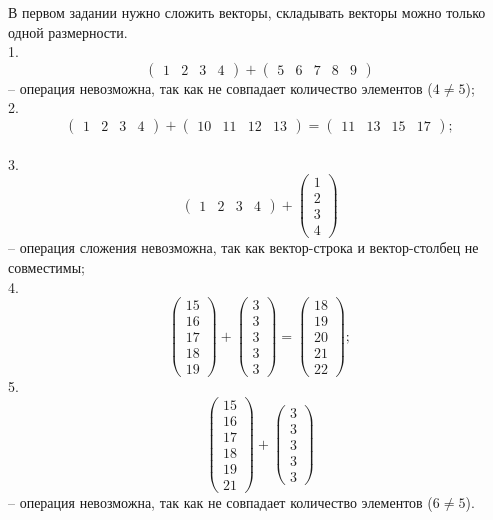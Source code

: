 \documentclass[14pt,a4paper]{extarticle}
\begin{document}
В первом задании нужно сложить векторы, складывать векторы можно только одной размерности.\\
1. \[\begin{pmatrix} 1 & 2 & 3 & 4 \end{pmatrix} + \begin{pmatrix} 5 & 6 & 7 & 8 & 9 \end{pmatrix}\]
-- операция невозможна, так как не совпадает количество элементов ($4 \neq 5$);\\
2. \[\begin{pmatrix} 1 & 2 & 3 & 4 \end{pmatrix} + \begin{pmatrix} 10 & 11 & 12 & 13 \end{pmatrix} = \begin{pmatrix} 11 & 13 & 15 & 17 \end{pmatrix};\]\\
3. \[\begin{pmatrix} 1 & 2 & 3 & 4 \end{pmatrix} + \begin{pmatrix} 1 \\ 2 \\ 3 \\ 4 \end{pmatrix}\]
-- операция сложения невозможна, так как вектор-строка и вектор-столбец не совместимы;\\
4. \[\begin{pmatrix} 15 \\ 16 \\ 17 \\ 18 \\ 19 \end{pmatrix} + \begin{pmatrix} 3 \\ 3 \\ 3 \\ 3 \\ 3 \end{pmatrix} = \begin{pmatrix} 18 \\ 19 \\ 20 \\ 21 \\ 22 \end{pmatrix};\]
5. \[\begin{pmatrix} 15 \\ 16 \\ 17 \\ 18 \\ 19 \\ 21 \end{pmatrix} + \begin{pmatrix} 3 \\ 3 \\ 3 \\ 3 \\ 3 \end{pmatrix}\]
-- операция невозможна, так как не совпадает количество элементов ($6 \neq 5$).\\
\end{document}
